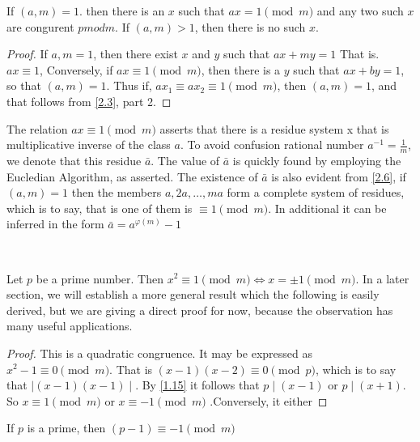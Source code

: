 \documentclass[11pt]{article}
\begin{document}
\begin{theorem}\label{2.9}
    If \((a, m) = 1\). then there is an \(x\) such that \(ax = 1 \pmod{m}\) and any two such \(x\) are congurent \(pmod{m}\). If \((a, m) > 1\), then there is no such \(x\).
\end{theorem}

\begin{proof}
    If \(a, m = 1\), then there exist \(x\) and \(y\) such that \(ax + my = 1\) That is. \(ax \equiv 1\), Conversely, if \(ax \equiv 1 \pmod{m}\), then there is a \(y\) such that \(ax + by = 1\), so that \((a, m) = 1\). Thus if, \(ax_1 \equiv ax_2 \equiv 1 \pmod{m}\), then \((a, m) = 1\), and that follows from \cref{2.3}, part 2.
\end{proof}
\begin{note}

    The relation \(ax \equiv 1 \pmod{m}\) asserts that there is a residue system x
    that is multiplicative inverse of the class \(a\). To avoid confusion rational
    number \(a^{-1} = \frac{1}{m}\), we denote that this residue \(\bar{a}\). The
    value of \(\bar{a}\) is quickly found by employing the Eucledian Algorithm, as
    asserted. The existence of \(\bar{a}\) is also evident from \cref{2.6}, if
    \((a, m) = 1\) then the members \(a, 2a, \ldots, ma\) form a complete system of
    residues, which is to say, that is one of them is \(\equiv 1 \pmod{m}\). In
    additional it can be inferred in the form \(\bar{a} = a^{\varphi(m)} - 1\)
\end{note}\

\begin{lemma}\label{2.10}
    Let \(p\) be a prime number. Then \(x^2 \equiv 1 \pmod{m} \Longleftrightarrow x = \pm 1 \pmod{m}\). In a later section, we will establish a more general result which the following is easily derived, but we are giving a direct proof for now, because the observation has many useful applications.
\end{lemma}
\begin{proof}
    This is a quadratic congruence. It may be expressed as \(x^2  - 1\equiv 0 \pmod{m}\). That is \((x - 1)(x - 2) \equiv 0 \pmod{p}\), which is to say that \(\mid (x - 1)(x - 1)\mid\). By \cref{1.15} it follows that \(p \mid (x - 1)\) or \(p \mid (x + 1)\). So \(x \equiv 1 \pmod{m}\) or \(x \equiv -1 \pmod{m}\) .Conversely, it either
\end{proof}

\begin{theorem}\label{2.11}
    If \(p\) is a prime, then \((p  - 1) \equiv -1 \pmod{m}\)
\end{theorem}
\end{document}
